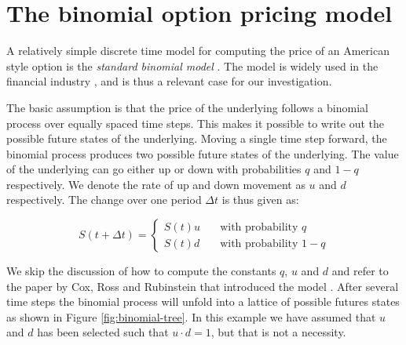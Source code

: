 \section{The binomial option pricing model}
\label{sec:binomial-model}
A relatively simple discrete time model for computing the price of an
American style option is the \emph{standard binomial model}
\cite{cox1979option}. The model is widely used in the financial
industry \cite{ganesan2009acceleration}, and is thus a relevant case
for our investigation.

The basic assumption is that the price of the underlying follows a
binomial process over equally spaced time steps. This makes it
possible to write out the possible future states of the
underlying. Moving a single time step forward, the binomial process
produces two possible future states of the underlying. The value of
the underlying can go either up or down with probabilities $q$ and $1
- q$ respectively. We denote the rate of up and down movement as $u$
and $d$ respectively. The change over one period $\Delta t$ is thus
given as:

$$S(t+\Delta t) = \left\{
  \begin{array}{ll}
    S(t)u & \quad \text{with probability $q$} \\
    S(t)d & \quad \text{with probability $1-q$}
  \end{array} \right.
$$

We skip the discussion of how to compute the constants $q$, $u$ and
$d$ and refer to the paper by Cox, Ross and Rubinstein that introduced
the model \cite{cox1979option}. After several time steps the binomial
process will unfold into a lattice of possible futures states as shown
in Figure \ref{fig:binomial-tree}. In this example we have assumed
that $u$ and $d$ has been selected such that $u\cdot d = 1$, but that
is not a necessity.


